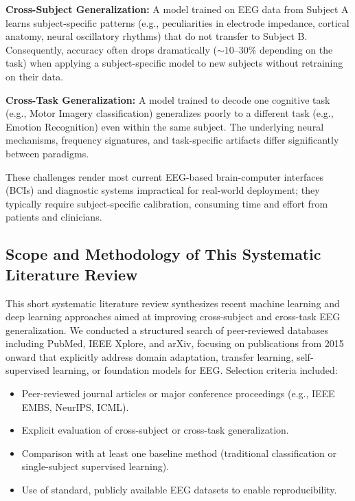 \documentclass[11pt]{article}
\begin{document}
\textbf{Cross-Subject Generalization:} A model trained on EEG data from Subject A learns subject-specific patterns (e.g., peculiarities in electrode impedance, cortical anatomy, neural oscillatory rhythms) that do not transfer to Subject B. Consequently, accuracy often drops dramatically ($\sim 10\text{--}30\%$ depending on the task) when applying a subject-specific model to new subjects without retraining on their data.

\textbf{Cross-Task Generalization:} A model trained to decode one cognitive task (e.g., Motor Imagery classification) generalizes poorly to a different task (e.g., Emotion Recognition) even within the same subject. The underlying neural mechanisms, frequency signatures, and task-specific artifacts differ significantly between paradigms.

These challenges render most current EEG-based brain-computer interfaces (BCIs) and diagnostic systems impractical for real-world deployment; they typically require subject-specific calibration, consuming time and effort from patients and clinicians.

\subsection{Scope and Methodology of This Systematic Literature Review}

This short systematic literature review synthesizes recent machine learning and deep learning approaches aimed at improving cross-subject and cross-task EEG generalization. We conducted a structured search of peer-reviewed databases including PubMed, IEEE Xplore, and arXiv, focusing on publications from 2015 onward that explicitly address domain adaptation, transfer learning, self-supervised learning, or foundation models for EEG. Selection criteria included:

\begin{itemize}
    \item Peer-reviewed journal articles or major conference proceedings (e.g., IEEE EMBS, NeurIPS, ICML).
    \item Explicit evaluation of cross-subject or cross-task generalization.
    \item Comparison with at least one baseline method (traditional classification or single-subject supervised learning).
    \item Use of standard, publicly available EEG datasets to enable reproducibility.
\end{itemize}
\end{document}

